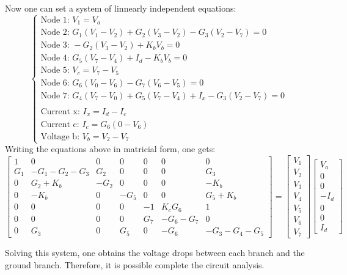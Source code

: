 Now one can set a system of linnearly independent equations:
$$
\begin{cases}
  \text{Node 1: } V_{1} = V_{a}\\
  \text{Node 2: } G_{1}(V_{1}-V_{2})+G_{2}(V_{3}-V_{2})-G_{3}(V_{2}-V_{7}) = 0\\
  \text{Node 3: } -G_{2}(V_{3}-V_{2})+K_bV_{b} = 0\\
  \text{Node 4: } G_{5}(V_{7}-V_{4})+I_{d}-K_bV_{b} = 0\\
  \text{Node 5: } V_{c}=V_{7}-V_{5}\\
  \text{Node 6: } G_{6}(V_{0}-V_{6})-G_{7}(V_{6}-V_{5}) = 0\\
  \text{Node 7: } G_{4}(V_{7}-V_{0})+G_{5}(V_{7}-V_{4})+I_{x}-G_{3}(V_{2}-V_{7}) = 0\\
  \\
  \text{Current x: } I_{x} = I_{d}-I_{c}\\
  \text{Current c: } I_{c} = G_{6}(0-V_{6})\\
  \text{Voltage b: } V_{b} = V_{2}-V_{7}
\end{cases}
$$
Writing the equations above in matricial form, one gets:
$$
\begin{bmatrix}
  1 & 0 & 0 & 0 & 0 & 0 & 0\\
  G_{1} & -G_{1}-G_{2}-G_{3} & G_{2} & 0 & 0 & 0 & G_{3}\\
  0 & G_{2}+K_{b} & -G_{2} & 0 & 0 & 0 & -K_{b}\\
  0 & -K_{b} & 0 & -G_{5} & 0 & 0 & G_{5}+K_{b}\\
  0 & 0 & 0 & 0 & -1 & K_{c}G_{6} & 1\\
  0 & 0 & 0 & 0 & G_{7} & -G_{6}-G_{7} & 0\\
  0 & G_{3} & 0 & G_{5} & 0 & -G_{6} & -G_{3}-G_{4}-G_{5}
\end{bmatrix}
=
\begin{bmatrix}
  V_{1}\\
  V_{2}\\
  V_{3}\\
  V_{4}\\
  V_{5}\\
  V_{6}\\
  V_{7}
\end{bmatrix}
\begin{bmatrix}
  V_{a}\\
  0\\
  0\\
  -I_{d}\\
  0\\
  0\\
  I_{d}
\end{bmatrix}
$$\par
Solving this system, one obtains the voltage drops between each branch and the ground branch. Therefore, it is possible complete the circuit analysis.

